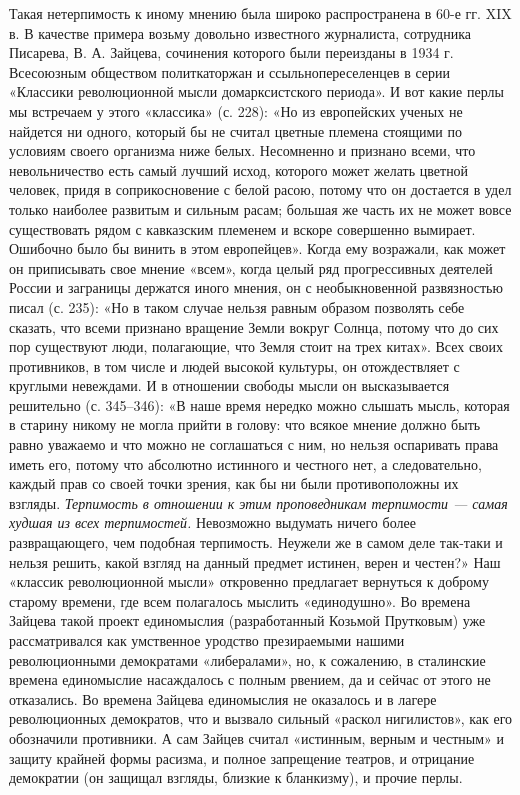 Такая нетерпимость к иному мнению была широко распространена в 60-е гг. XIX в.
В качестве примера возьму довольно известного журналиста, сотрудника Писарева,
В. А. Зайцева, сочинения которого были переизданы в 1934 г. Всесоюзным
обществом политкаторжан и ссыльнопереселенцев в серии «Классики революционной
мысли домарксистского периода». И вот какие перлы мы встречаем у этого
«классика» (с. 228): «Но из европейских ученых не найдется ни одного, который
бы не считал цветные племена стоящими по условиям своего организма ниже белых.
Несомненно и признано всеми, что невольничество есть самый лучший исход,
которого может желать цветной человек, придя в соприкосновение с белой расою,
потому что он достается в удел только наиболее развитым и сильным расам;
большая же часть их не может вовсе существовать рядом с кавказским племенем и
вскоре совершенно вымирает. Ошибочно было бы винить в этом европейцев». Когда
ему возражали, как может он приписывать свое мнение «всем», когда целый ряд
прогрессивных деятелей России и заграницы держатся иного мнения, он с
необыкновенной развязностью писал (с. 235): «Но в таком случае нельзя равным
образом позволять себе сказать, что всеми признано вращение Земли вокруг
Солнца, потому что до сих пор существуют люди, полагающие, что Земля стоит на
трех китах». Всех своих противников, в том числе и людей высокой культуры, он
отождествляет с круглыми невеждами. И в отношении свободы мысли он
высказывается решительно (с. 345--346): «В наше время нередко можно слышать
мысль, которая в старину никому не могла прийти в голову: что всякое мнение
должно быть равно уважаемо и что можно не соглашаться с ним, но нельзя
оспаривать права иметь его, потому что абсолютно истинного и честного нет, а
следовательно, каждый прав со своей точки зрения, как бы ни были противоположны
их взгляды. \emph{Терпимость в отношении к этим проповедникам терпимости --- самая
худшая из всех терпимостей.} Невозможно выдумать ничего более развращающего,
чем подобная терпимость. Неужели же в самом деле так-таки и нельзя решить,
какой взгляд на данный предмет истинен, верен и честен?» Наш «классик
революционной мысли» откровенно предлагает вернуться к доброму старому времени,
где всем полагалось мыслить «единодушно». Во времена Зайцева такой проект
единомыслия (разработанный Козьмой Прутковым) уже рассматривался как умственное
уродство презираемыми нашими революционными демократами «либералами», но, к
сожалению, в сталинские времена единомыслие насаждалось с полным рвением, да и
сейчас от этого не отказались. Во времена Зайцева единомыслия не оказалось и в
лагере революционных демократов, что и вызвало сильный «раскол нигилистов», как
его обозначили противники. А сам Зайцев считал «истинным, верным и честным» и
защиту крайней формы расизма, и полное запрещение театров, и отрицание
демократии (он защищал взгляды, близкие к бланкизму), и прочие перлы.

